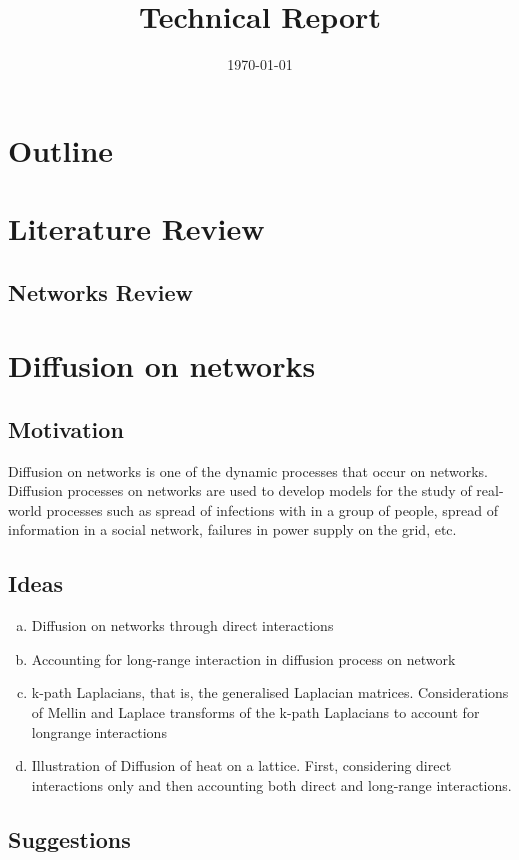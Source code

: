 \documentclass[10pt,a4paper]{article}
\title{Technical Report}
\date{\today}
\begin{document}
	\maketitle
	
	\vspace{1cm}
	\section*{Outline}
	\section{Literature Review}
	\subsection{Networks Review}
	\section{Diffusion on networks}
	\subsection{Motivation}
	Diffusion on networks is one of the dynamic processes that occur on networks. Diffusion processes on networks are used to develop models for the study of real-world processes such as spread of infections with in a group of people, spread of information in a social network, failures in power supply on the grid, etc.
	\subsection{Ideas}
	\begin{enumerate}[a)]
		\item  Diffusion on networks through direct interactions
		\item  Accounting for long-range interaction in diffusion process on network
		\item k-path Laplacians, that is, the generalised Laplacian matrices. Considerations of Mellin and Laplace transforms of the k-path Laplacians to account for longrange interactions
		\item Illustration of Diffusion of heat on a lattice. First, considering direct interactions only and then accounting both direct and long-range interactions. 
	\end{enumerate}
    \subsection{Suggestions}
    
\end{document}
